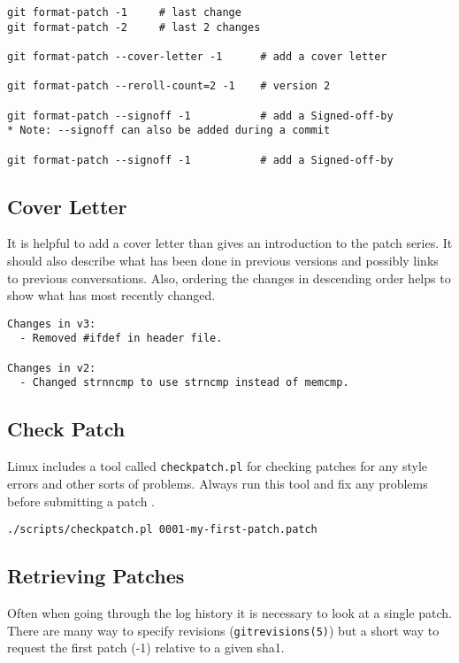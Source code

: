 \documentclass{article}
\begin{document}
\begin{verbatim}
git format-patch -1     # last change
git format-patch -2     # last 2 changes

git format-patch --cover-letter -1      # add a cover letter

git format-patch --reroll-count=2 -1    # version 2

git format-patch --signoff -1           # add a Signed-off-by
* Note: --signoff can also be added during a commit

git format-patch --signoff -1           # add a Signed-off-by
\end{verbatim}

\subsection{Cover Letter}

It is helpful to add a cover letter than gives an introduction to the
patch series.  It should also describe what has been done in previous
versions and possibly links to previous conversations.  Also, ordering
the changes in descending order helps to show what has most recently
changed.

\begin{verbatim}
Changes in v3:
  - Removed #ifdef in header file.
    
Changes in v2:
  - Changed strnncmp to use strncmp instead of memcmp.
\end{verbatim}

\subsection{Check Patch}

Linux includes a tool called \verb+checkpatch.pl+ for checking patches for
any style errors and other sorts of problems.  Always run this tool and
fix any problems before submitting a patch \autocite{firstpatch}\autocite{CodingStyle}.

\begin{verbatim}
./scripts/checkpatch.pl 0001-my-first-patch.patch
\end{verbatim}

\subsection{Retrieving Patches}

Often when going through the log history it is necessary to look at a
single patch.  There are many way to specify revisions (\verb+gitrevisions(5)+) but
a short way to request the first patch (-1) relative to a given sha1.
\end{document}
